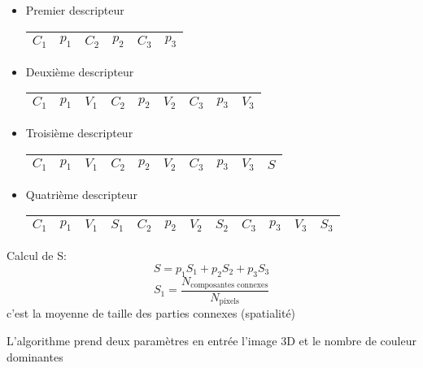 \documentclass[12pt,a4paper,notitlepage]{report}
\begin{document}
\begin{itemize}
	\item	Premier descripteur 
	\begin{tabular}{|c|c|c|c|c|c|}
		\hline 
		$C_1$&$p_1$ & $C_2$ & $p_2$ & $C_3$ & $p_3$ \\ \hline
	\end{tabular}
		\item	Deuxième descripteur 
	\begin{tabular}{|c|c|c|c|c|c|c|c|c|}
		\hline 
		$C_1$&$p_1$ & $V_1$ & $C_2$ & $p_2$ & $V_2$ & $C_3$ & $p_3$ & $V_3$\\ \hline
	\end{tabular}
		\item	Troisième descripteur 
	\begin{tabular}{|c|c|c|c|c|c|c|c|c|c|}
		\hline 
		$C_1$&$p_1$ & $V_1$ & $C_2$ & $p_2$ & $V_2$ & $C_3$ & $p_3$ & $V_3$ & $S$\\ \hline
	\end{tabular}
		\item	Quatrième descripteur 
	\begin{tabular}{|c|c|c|c|c|c|c|c|c|c|c|c|}
		\hline 
		$C_1$&$p_1$ & $V_1$ & $S_1$ & $C_2$ & $p_2$ & $V_2$ & $S_2$ & $C_3$ & $p_3$ & $V_3$ & $S_3$\\ \hline
	\end{tabular}
\end{itemize}
Calcul de S:\\


$$S=p_1S_1+p_2S_2+p_3S_3$$
$$S_1=\frac{N_\text{composantes connexes}}{N_\text{pixels}}$$
c'est la moyenne de taille des parties connexes (spatialité)


L'algorithme prend deux paramètres en entrée l'image 3D et le nombre de couleur dominantes
\end{document}
